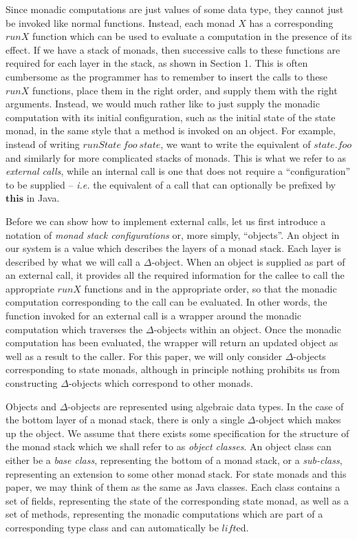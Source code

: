 Since monadic computations are just values of some data type, they cannot just be invoked like normal functions. Instead, each monad $X$ has a corresponding $\mathit{runX}$ function which can be used to evaluate a computation in the presence of its effect. If we have a stack of monads, then successive calls to these functions are required for each layer in the stack, as shown in Section 1. This is often cumbersome as the programmer has to remember to insert the calls to these $\mathit{runX}$ functions, place them in the right order, and supply them with the right arguments. Instead, we would much rather like to just supply the monadic computation with its initial configuration, such as the initial state of the state monad, in the same style that a method is invoked on an object. For example, instead of writing $\mathit{runState}~\mathit{foo}~\mathit{state}$, we want to write the equivalent of $\mathit{state}.\mathit{foo}$ and similarly for more complicated stacks of monads. This is what we refer to as \emph{external calls}, while an internal call is one that does not require a ``configuration'' to be supplied -- \emph{i.e.} the equivalent of a call that can optionally be prefixed by $\mathbf{this}$ in Java. 

Before we can show how to implement external calls, let us first introduce a notation of \emph{monad stack configurations} or, more simply, ``objects''. An object in our system is a value which describes the layers of a monad stack. Each layer is described by what we will call a $\Delta$-object. When an object is supplied as part of an external call, it provides all the required information for the callee to call the appropriate $\mathit{runX}$ functions and in the appropriate order, so that the monadic computation corresponding to the call can be evaluated. In other words, the function invoked for an external call is a wrapper around the monadic computation which traverses the $\Delta$-objects within an object. Once the monadic computation has been evaluated, the wrapper will return an updated object as well as a result to the caller. For this paper, we will only consider $\Delta$-objects corresponding to state monads, although in principle nothing prohibits us from constructing $\Delta$-objects which correspond to other monads.

Objects and $\Delta$-objects are represented using algebraic data types. In the case of the bottom layer of a monad stack, there is only a single $\Delta$-object which makes up the object. We assume that there exists some specification for the structure of the monad stack which we shall refer to as \emph{object classes}. An object class can either be a \emph{base class}, representing the bottom of a monad stack, or a \emph{sub-class}, representing an extension to some other monad stack. For state monads and this paper, we may think of them as the same as Java classes. Each class contains a set of fields, representing the state of the corresponding state monad, as well as a set of methods, representing the monadic computations which are part of a corresponding type class and can automatically be $\mathit{lift}$ed. 

